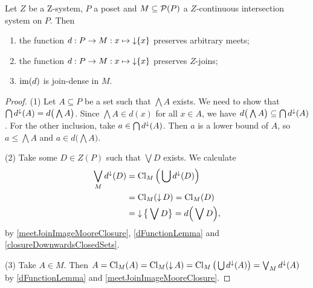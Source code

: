 \begin{proposition} \label{continuousIntersectionSystemGivesJoinDenseCompletion}
Let $Z$ be a $\mathrm{Z}$-system, $P$ a poset and $M \subseteq \operatorname{\mathcal{P}}(P)$ a $Z$-continuous intersection system on $P$. Then
\begin{enumerate}
\item the function $d: P\to M: x\mapsto \operatorname{\downarrow}\{x\}$ preserves arbitrary meets;
\item the function $d: P\to M: x\mapsto \operatorname{\downarrow}\{x\}$ preserves $Z$-joins;
\item $\operatorname{im}(d)$ is join-dense in $M$.
\end{enumerate}
\end{proposition}
\begin{proof}
(1) Let $A\subseteq P$ be a set such that $\bigwedge A$ exists. We need to show that $\bigcap d^\downarrow(A) = d\big(\bigwedge A\big)$. Since $\bigwedge A \in d(x)$ for all $x\in A$, we have $d\big(\bigwedge A\big) \subseteq \bigcap d^\downarrow(A)$. For the other inclusion, take $a\in \bigcap d^\downarrow(A)$. Then $a$ is a lower bound of $A$, so $a \leq \bigwedge A$ and $a \in d\big(\bigwedge A\big)$.

(2) Take some $D\in Z(P)$ such that $\bigvee D$ exists. We calculate
\begin{align*}
\bigvee_{M} d^\downarrow(D) &= \operatorname{Cl}_{M}\Big(\bigcup d^\downarrow(D)\Big) \\
&= \operatorname{Cl}_{M}(\operatorname{\downarrow} D) = \operatorname{Cl}_{M}(D) \\
&= \operatorname{\downarrow}\big\{\bigvee D\big\} = d\Big(\bigvee D\Big),
\end{align*}
by \ref{meetJoinImageMooreClosure}, \ref{dFunctionLemma} and \ref{closureDownwardsClosedSets}.

(3) Take $A \in M$. Then $A = \operatorname{Cl}_M(A) = \operatorname{Cl}_M(\operatorname{\downarrow} A) = \operatorname{Cl}_M\big(\bigcup d^\downarrow(A)\big) = \bigvee_M d^\downarrow(A)$ by \ref{dFunctionLemma} and \ref{meetJoinImageMooreClosure}.
\end{proof}

